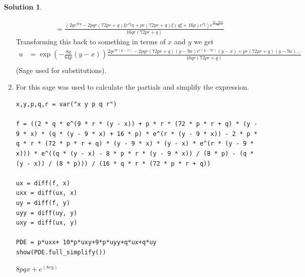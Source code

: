 \documentclass[10pt]{article}
\makeatletter
\theoremstyle{definition}
\newtheorem{soln}{Solution}
\newcommand{\boxspacing}{\kern\kvtcb@left@rule\kern\kvtcb@boxsep}
\newcommand{\prompt}[4]{
    \ttfamily\llap{{\color{#2}[#3]:\hspace{3pt}#4}}\vspace{-\baselineskip}
}
\makeatother
\begin{document}
\begin{soln}
\begin{enumerate}[label=(\alph*)]
\begin{align*}
                                                 & =\frac{\left(2qe^{9r{\eta}} - 2pqr \left(72pr + q\right) {\xi}e^{r{\xi}} {\eta} + pr \left(72pr + q\right) {\xi} \left(q{\xi} + 16p\right) e^{r{\xi}}\right) e^{\frac{q{\eta} - 8pr{\xi}}{8p}}}{16qr \left(72pr + q\right)}
          \end{align*}
          Transforming this back to something in terms of $x$ and $y$ we get
          \begin{align*}
            u & =\exp\left(-\frac{8q}{64p}(y-x)\right)\frac{2qe^{9r{(y-x)}} - 2pqr \left(72pr + q\right) {(y-9x)}e^{r{(y-9x)}} {(y-x)} + pr \left(72pr + q\right) {(y-9x)}\dots}{16qr \left(72pr + q\right)} \\
          \end{align*}
          (Sage used for substitutions).
    \item For this sage was used to calculate the partials and simplify the expression.
          \begin{tcolorbox}[breakable, size=fbox, boxrule=1pt, pad at break*=1mm,colback=cellbackground, colframe=cellborder]
            \prompt{In}{incolor}{1}{\boxspacing}
            \begin{verbatim}
x,y,p,q,r = var("x y p q r")

f = ((2 * q * e^(9 * r * (y - x)) + p * r * (72 * p * r + q) * (y - 9 * x) * (q * (y - 9 * x) + 16 * p) * e^(r * (y - 9 * x)) - 2 * p * q * r * (72 * p * r + q) * (y - 9 * x) * (y - x) * e^(r * (y - 9 * x))) * e^((q * (y - x) - 8 * p * r * (y - 9 * x)) / (8 * p) - (q * (y - x)) / (8 * p))) / (16 * q * r * (72 * p * r + q))

ux = diff(f, x)
uxx = diff(ux, x)
uy = diff(f, y)
uyy = diff(uy, y)
uxy = diff(ux, y)

PDE = p*uxx+ 10*p*uxy+9*p*uyy+q*ux+q*uy 
show(PDE.full_simplify())
              \end{verbatim}
          \end{tcolorbox}
          \begin{tcolorbox}[breakable, size=fbox, boxrule=.5pt, pad at break*=1mm, opacityfill=0]
            \prompt{Out}{outcolor}{1}{\boxspacing}
            $\displaystyle 8 p q x + e^{\left(8 r y\right)}$
          \end{tcolorbox}
  \end{enumerate}
\end{soln}
\end{document}
